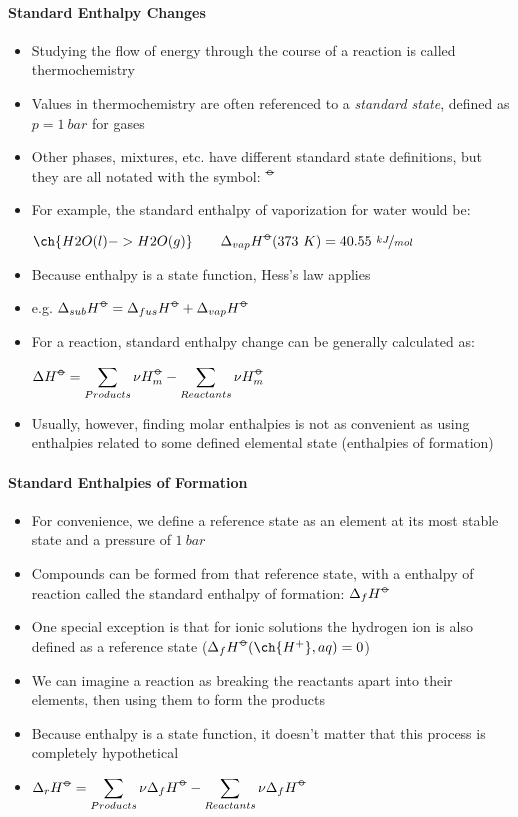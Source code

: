 \documentclass[12pt, openany, letterpaper]{memoir}
\begin{document}
\paragraph{Standard Enthalpy Changes}
\begin{itemize}
	\item Studying the flow of energy through the course of a reaction is called thermochemistry
	\item Values in thermochemistry are often referenced to a \emph{standard state}, defined as $p=1~bar$ for gases
	\item Other phases, mixtures, etc. have different standard state definitions, but they are all notated with the symbol: $^{\std}$
	\item For example, the standard enthalpy of vaporization for water would be:
	
	$\ch{H2O(l) -> H2O(g)} \hspace{2em} \Delta_{vap}H^{\std}(373~K) = 40.55~\nicefrac{kJ}{mol}$
	\item Because enthalpy is a state function, Hess's law applies
	\item e.g. $\Delta_{sub}H^{\std} = \Delta_{fus}H^{\std} + \Delta_{vap}H^{\std}$
	\item For a reaction, standard enthalpy change can be generally calculated as:
	
	$\Delta H^{\std} = \displaystyle\sum\limits_{Products}\nu H^{\std}_m - \displaystyle\sum\limits_{Reactants} \nu H^{\std}_m$
	\item Usually, however, finding molar enthalpies is not as convenient as using enthalpies related to some defined elemental state (enthalpies of formation)	
\end{itemize}
\paragraph{Standard Enthalpies of Formation}
\begin{itemize}
	\item For convenience, we define a reference state as an element at its most stable state and a pressure of $1~bar$
	\item Compounds can be formed from that reference state, with a enthalpy of reaction called the standard enthalpy of formation: $\Delta_fH^{\std}$
	\item One special exception is that for ionic solutions the hydrogen ion is also defined as a reference state ($\Delta_f H^{\std}(\ch{H^+}, aq) =0$)
	\item We can imagine a reaction as breaking the reactants apart into their elements, then using them to form the products
	\item Because enthalpy is a state function, it doesn't matter that this process is completely hypothetical
	\item $\Delta_rH^{\std}=\displaystyle\sum\limits_{Products}\nu \Delta_fH^{\std} - \displaystyle\sum\limits_{Reactants}\nu\Delta_fH^{\std}$
\end{itemize}
\end{document}
